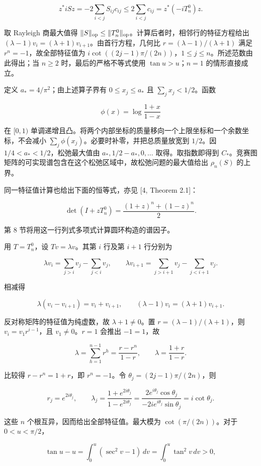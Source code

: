 \documentclass[11pt,a4paper]{article}
\begin{document}
\[z^*iSz=-2\sum_{i<j}S_{ij}c_{ij}
\le2\sum_{i<j}c_{ij}=z^*(-iT_n^0)z.\]

取 Rayleigh 商最大值得 \(\|S\|_{\rm op}\le\|T_n^0\|_{\rm op}\)。计算后者时，相邻行的特征方程给出 \((\lambda-1)v_i=(\lambda+1)v_{i+1}\)。由首行方程，几何比 \(r=(\lambda-1)/(\lambda+1)\) 满足 \(r^n=-1\)，故全部特征值为 \(i\cot((2j-1)\pi/(2n))\)，\(1\le j\le n\)。所述范数由此得出；当 \(n\ge2\) 时，最后的严格不等式使用 \(\tan u>u\)；\(n=1\) 的情形直接成立。

定义 \(a_*=4/\pi^2\)；由上述算子界有 \(0\le x_j\le a_*\) 且 \(\sum_jx_j<1/2\)。函数

\[\phi(x)=\log\frac{1+x}{1-x}\]

在 \([0,1)\) 单调递增且凸。将两个内部坐标的质量移向一个上限坐标和一个余数坐标，不会减小 \(\sum_j\phi(x_j)\)。必要时补零，并把总质量放宽到 \(1/2\)。因 \(1/4<a_*<1/2\)，松弛最大值由 \(a_*,1/2-a_*,0,\ldots\) 取得。取指数即得到 \(C_*\)。竞赛图矩阵的可实现谱包含在这个松弛区域中，故松弛问题的最大值给出 \(\rho_n(S)\) 的上界。

同一特征值计算也给出下面的恒等式，亦见 {[}4, Theorem 2.1{]}：

\[\det(I+zT_n^0)=\frac{(1+z)^n+(1-z)^n}{2}.\]

第 8 节将用这一行列式多项式计算圆环构造的谱因子。

用 \(T=T_n^0\)，设 \(Tv=\lambda v\)。其第 \(i\) 行及第 \(i+1\) 行分别为

\[\lambda v_i=\sum_{j>i}v_j-\sum_{j<i}v_j,\qquad
\lambda v_{i+1}=\sum_{j>i+1}v_j-\sum_{j<i+1}v_j.\]

相减得

\[\lambda(v_i-v_{i+1})=v_i+v_{i+1},\qquad
(\lambda-1)v_i=(\lambda+1)v_{i+1}.\]

反对称矩阵的特征值为纯虚数，故 \(\lambda+1\ne0\)。置 \(r=(\lambda-1)/(\lambda+1)\)，则 \(v_i=v_1r^{i-1}\)，且 \(v_1\ne0\)。\(r=1\) 会推出 \(-1=1\)，故

\[\lambda=\sum_{h=1}^{n-1}r^h=\frac{r-r^n}{1-r},\qquad
\lambda=\frac{1+r}{1-r}.\]

比较得 \(r-r^n=1+r\)，即 \(r^n=-1\)。令 \(\theta_j=(2j-1)\pi/(2n)\)，则

\[r_j=e^{2i\theta_j},\qquad
\lambda_j=\frac{1+e^{2i\theta_j}}{1-e^{2i\theta_j}}
=\frac{2e^{i\theta_j}\cos\theta_j}{-2ie^{i\theta_j}\sin\theta_j}
=i\cot\theta_j.\]

这些 \(n\) 个根互异，因而给出全部特征值。最大模为 \(\cot(\pi/(2n))\)。对于 \(0<u<\pi/2\)，

\[\tan u-u=\int_0^u(\sec^2v-1)\,dv=\int_0^u\tan^2v\,dv>0,\]
\end{document}
